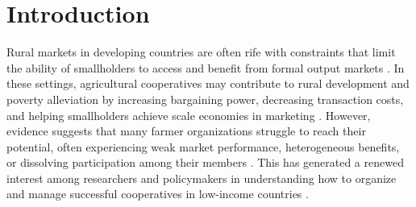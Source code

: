 \documentclass[11pt]{article}
\begin{document}
\clearpage
\renewcommand{\cftsecleader}{\cftdotfill{\cftdotsep}}


\doublespacing
\thispagestyle{plain}
\setcounter{page}{1}

\section{Introduction} \label{sec:intro}



Rural markets in developing countries are often rife with constraints that limit the ability of smallholders to access and benefit from formal output markets \citep{barrett_smallholder_2008}. In these settings, agricultural cooperatives may contribute to rural development and poverty alleviation by increasing bargaining power, decreasing transaction costs, and helping smallholders achieve scale economies in marketing \citep{markelova_collective_2010,staal_smallholder_1997,csaki_reaching_2003}. However, evidence suggests that many farmer organizations struggle to reach their potential, often experiencing weak market performance, heterogeneous benefits, or dissolving participation among their members \citep{bernard_reaching_2009, casaburi_loyalty_2015,fischer_smallholder_2014}. This has generated a renewed interest among researchers and policymakers in understanding how to organize and manage successful cooperatives in low-income countries \citep{world_bank_world_2008}. 
\end{document}
